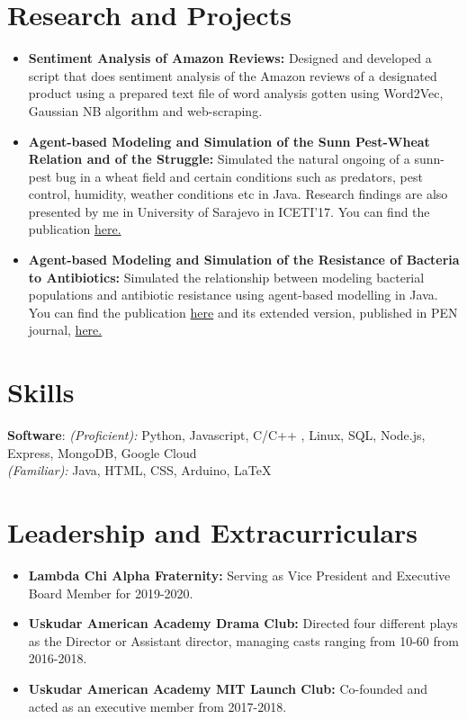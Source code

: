\documentclass[letterpaper,11pt]{article}
\newcommand{\resumeItem}[2]{
  \item\small{
    \textbf{#1}{#2 \vspace{-2pt}}
  }
}
\newcommand{\resumeSubItem}[2]{\resumeItem{#1}{#2}\vspace{-4pt}}
\newcommand{\resumeSubHeadingListStart}{\begin{itemize}[leftmargin=*]}
\newcommand{\resumeSubHeadingListEnd}{\end{itemize}}
\begin{document}
	\section{Research and Projects}
	\resumeSubHeadingListStart
	\resumeSubItem{Sentiment Analysis of Amazon Reviews: }
	{Designed and developed a script that does sentiment analysis of the Amazon reviews of a designated product using a prepared text file of word analysis gotten using Word2Vec, Gaussian NB algorithm and web-scraping.}
	\resumeSubItem{Agent-based Modeling and Simulation of the Sunn Pest-Wheat Relation and of the Struggle: }
	{Simulated the natural ongoing of a sunn-pest bug in a wheat field and certain conditions such as predators, pest control, humidity, weather conditions etc in Java. Research findings are also presented by me in University of Sarajevo in ICETI'17. You can find the publication  {\href{ https://www.iceti.org/sites/default/files/2017-iceti-proceeding-book-v2.pdf}{here.}}}
	\resumeSubItem{Agent-based Modeling and Simulation of the Resistance of Bacteria to Antibiotics: }
	{Simulated the relationship between modeling bacterial populations and antibiotic resistance using agent-based modelling in Java. You can find the publication  {\href{ https://www.iceti.org/sites/default/files/2017-iceti-proceeding-book-v2.pdf}{here}} and its extended version, published in PEN journal, {\href{http://pen.ius.edu.ba/index.php/pen/article/view/146/156}{here.}}} 
	\resumeSubHeadingListEnd
	
	
	\section{Skills}\vspace{-2pt}
	\textbf{Software}{: \textit{(Proficient):} Python, Javascript, C/C++ , Linux, SQL, Node.js, Express, MongoDB, Google Cloud \\ 
		\qquad\qquad\quad \textit{(Familiar):  }  Java, HTML, CSS, Arduino, LaTeX}\vspace{-5pt}
	\section{Leadership and Extracurriculars}
	\resumeSubHeadingListStart
	\resumeSubItem{Lambda Chi Alpha Fraternity: }
	{Serving as Vice President and Executive Board Member for 2019-2020.}
	\resumeSubItem{Uskudar American Academy Drama Club: }
	{Directed four different plays as the Director or Assistant director, managing casts ranging from 10-60 from 2016-2018.}
	\resumeSubItem{Uskudar American Academy MIT Launch Club: }
	{Co-founded and acted as an executive member from 2017-2018.}
	
	
	\resumeSubHeadingListEnd
	
	
\end{document}
